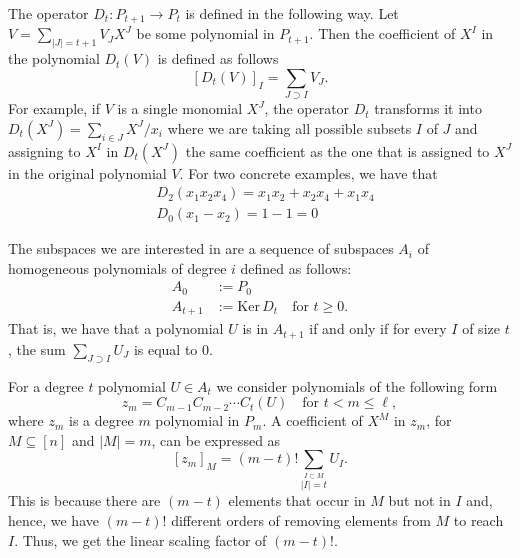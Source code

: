 \documentclass[a4paper,twoside,justified]{tufte-handout}
\begin{document}
The operator $D_t \colon P_{t + 1} \to P_t$ is defined in the
following way. Let $V = \sum_{|J| = t + 1} V_J X^J$ be some polynomial
in $P_{t + 1}$. Then the coefficient of $X^I$ in the polynomial
$D_t(V)$ is defined as follows
\begin{equation}
  \left[D_t(V)\right]_I = \sum_{J \supset I} V_J.
\end{equation}
For example, if $V$ is a single monomial $X^J$, the operator $D_t$
transforms it into~$D_t(X^J) = \sum_{i \in J} X^J / x_i$ where we are
taking all possible subsets $I$ of $J$ and assigning to $X^I$ in
$D_t(X^J)$ the same coefficient as the one that is assigned to $X^J$
in the original polynomial $V$. For two concrete examples, we have that
\begin{align}
  &D_2(x_1 x_2 x_4) = x_1 x_2 + x_2 x_4 + x_1 x_4 \\
  &D_0(x_1 - x_2) = 1 - 1 = 0
\end{align}

The subspaces we are interested in are a sequence of subspaces $A_i$
of homogeneous polynomials of degree $i$ defined as follows:
\begin{align}
  A_0 &:= P_0 \\
  A_{t + 1} &:= \mathrm{Ker} \, D_t \quad \text{for } t \geq 0.
\end{align}
That is, we have that a polynomial $U$ is in $A_{t + 1}$ if and only
if for every $I$ of size $t$, the sum $\sum_{J \supset I} U_J$ is
equal to $0$.

For a degree $t$ polynomial $U \in A_t$ we consider polynomials of the
following form
\begin{equation}
  z_m = C_{m - 1} C_{m - 2} \cdots C_t(U) \quad \text{for $t < m \leq \ell$},
\end{equation}
where $z_m$ is a degree $m$ polynomial in $P_m$. A coefficient of
$X^M$ in $z_m$, for $M \subseteq [n]$ and $|M| = m$, can be expressed
as
\begin{equation}
  \left[z_m\right]_M = (m - t)! \sum_{\stackrel{I \subset M}{|I| = t}} U_I.
\end{equation}
This is because there are $(m - t)$ elements that occur in $M$ but not
in $I$ and, hence, we have $(m - t)!$ different orders of removing
elements from $M$ to reach $I$. Thus, we get the linear scaling factor
of $(m - t)!$.
\end{document}
